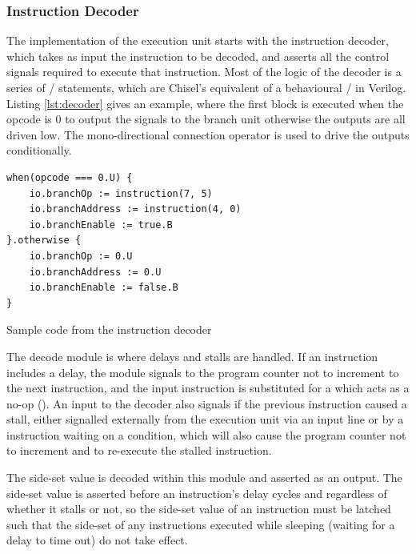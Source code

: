 \subsubsection{Instruction Decoder}

The implementation of the execution unit starts with the instruction decoder, which takes as input the instruction to be decoded, and asserts all the control signals required to execute that instruction. Most of the logic of the decoder is a series of / statements, which are Chisel's equivalent of a behavioural / in Verilog. Listing \ref{lst:decoder} gives an example, where the first block is executed when the opcode is 0 to output the signals to the branch unit otherwise the outputs are all driven low. The mono-directional connection operator \txt{:=} is used to drive the outputs conditionally.

\begin{listing}[h!]
    \vspace{0.5cm}
    \begin{verbatim}
when(opcode === 0.U) {
    io.branchOp := instruction(7, 5)
    io.branchAddress := instruction(4, 0)
    io.branchEnable := true.B
}.otherwise {
    io.branchOp := 0.U
    io.branchAddress := 0.U
    io.branchEnable := false.B
}
    \end{verbatim}
    \caption{Sample code from the instruction decoder}
    \label{lst:decoder}
\end{listing}

The decode module is where delays and stalls are handled. If an instruction includes a delay, the module signals to the program counter not to increment to the next instruction, and the input instruction is substituted for a  which acts as a no-op (). An input to the decoder also signals if the previous instruction caused a stall, either signalled externally from the execution unit via an input line or by a  instruction waiting on a condition, which will also cause the program counter not to increment and to re-execute the stalled instruction.

The side-set value is decoded within this module and asserted as an output. The side-set value is asserted before an instruction's delay cycles and regardless of whether it stalls or not, so the side-set value of an instruction must be latched such that the side-set of any  instructions executed while sleeping (waiting for a delay to time out) do not take effect.

